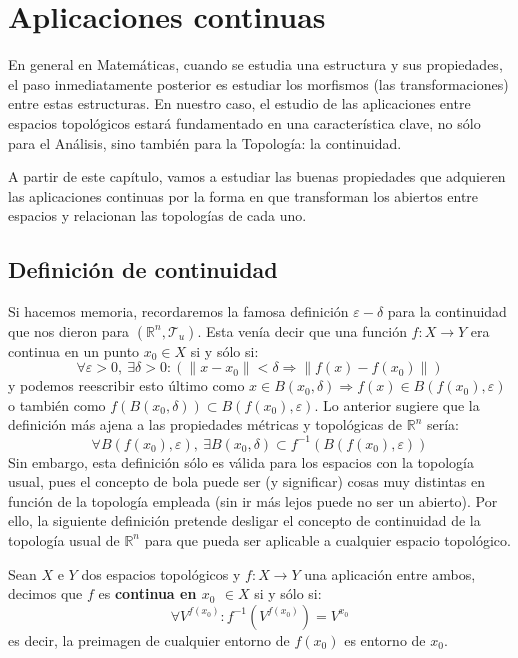 \chapter{Aplicaciones continuas}%
\label{cha:aplicaciones_continuas}
En general en Matemáticas, cuando se estudia una estructura y sus propiedades, el paso inmediatamente posterior es estudiar los morfismos (las transformaciones) entre estas estructuras. En nuestro caso, el estudio de las aplicaciones entre espacios topológicos estará fundamentado en una característica clave, no sólo para el Análisis, sino también para la Topología: la continuidad.

A partir de este capítulo, vamos a estudiar las buenas propiedades que adquieren las aplicaciones continuas por la forma en que transforman los abiertos entre espacios y relacionan las topologías de cada uno.

\section{Definición de continuidad}%
\label{sec:continuidad}

Si hacemos memoria, recordaremos la famosa definición $\varepsilon-\delta$ para la continuidad que nos dieron para $\left( \mathbb{R}^n, \mathcal{T}_u \right)$. Esta venía decir que una función $f : X \rightarrow Y$ era continua en un punto $x_0\in X$ si y sólo si:
\[
\forall \varepsilon > 0, \ \exists \delta > 0 : \left(\lVert x - x_0 \rVert < \delta \Rightarrow \lVert f(x) - f(x_0) \rVert \right)
\]
y podemos reescribir esto último como $x \in B\left( x_0, \delta \right) \Rightarrow f\left( x \right) \in B\left( f\left( x_0 \right), \varepsilon \right)$ o también como $f\left( B\left( x_0, \delta \right) \right) \subset B\left( f\left( x_0 \right), \varepsilon \right) $. Lo anterior sugiere que la definición más ajena a las propiedades métricas y topológicas de $\mathbb{R}^n$ sería:
\[
\forall B\left( f\left( x_0 \right), \varepsilon \right),\ \exists B\left( x_0, \delta \right) \subset f^{-1}\left( B\left( f\left( x_0 \right), \varepsilon \right) \right)
\]
Sin embargo, esta definición sólo es válida para los espacios con la topología usual, pues el concepto de bola puede ser (y significar) cosas muy distintas en función de la topología empleada (sin ir más lejos puede no ser un abierto). Por ello, la siguiente definición pretende desligar el concepto de continuidad de la topología usual de $\mathbb{R}^n$ para que pueda ser aplicable a cualquier espacio topológico.

\begin{defi}[Continuidad]
Sean $X$ e $Y$ dos espacios topológicos y $f: X \rightarrow Y$ una aplicación entre ambos, decimos que $f$ es \textbf{continua en $x_0$ $\in X$} si y sólo si:
\[
\forall V^{f\left( x_0 \right)} :  f^{-1}\left( V^{f\left( x_0 \right)} \right) = V^{x_0} 
\]
es decir, la preimagen de cualquier entorno de $f(x_0)$ es entorno de $x_0$.
\end{defi}

